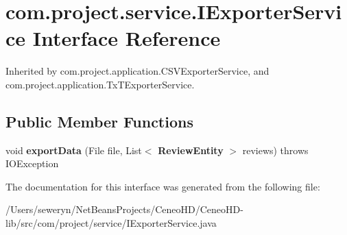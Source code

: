 \section{com.\+project.\+service.\+I\+Exporter\+Service Interface Reference}
\label{interfacecom_1_1project_1_1service_1_1_i_exporter_service}


Inherited by com.\+project.\+application.\+C\+S\+V\+Exporter\+Service, and com.\+project.\+application.\+Tx\+T\+Exporter\+Service.

\subsection*{Public Member Functions}
\begin{DoxyCompactItemize}
\item 
\mbox{\label{interfacecom_1_1project_1_1service_1_1_i_exporter_service_a5dd5d570d540f5092783e98f32584ea1}} 
void {\bfseries export\+Data} (File file, List$<$ \textbf{ Review\+Entity} $>$ reviews)  throws I\+O\+Exception
\end{DoxyCompactItemize}


The documentation for this interface was generated from the following file\+:\begin{DoxyCompactItemize}
\item 
/\+Users/seweryn/\+Net\+Beans\+Projects/\+Ceneo\+H\+D/\+Ceneo\+H\+D-\/lib/src/com/project/service/I\+Exporter\+Service.\+java\end{DoxyCompactItemize}

